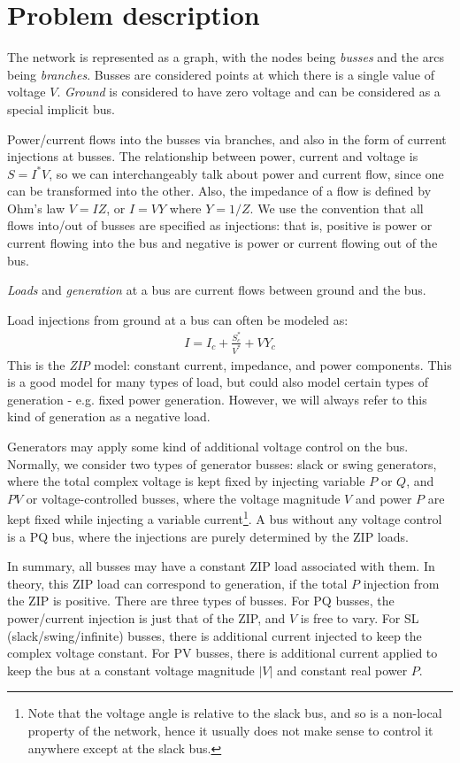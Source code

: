 \documentclass[11pt]{article}
\begin{document}
\section{Problem description}
The network is represented as a graph, with the nodes being \emph{busses} and the arcs being \emph{branches}. Busses are considered points at which there is a single value of voltage $V$. \emph{Ground} is considered to have zero voltage and can be considered as a special implicit bus. 

Power/current flows into the busses via branches, and also in the form of current injections at busses. The relationship between power, current and voltage is $S = I^*V$, so we can interchangeably talk about power and current flow, since one can be transformed into the other. Also, the impedance of a flow is defined by Ohm's law $V = IZ$, or $I = VY$ where $Y = 1/Z$. We use the convention that all flows into/out of busses are specified as injections: that is, positive is power or current flowing into the bus and negative is power or current flowing out of the bus.

\emph{Loads} and \emph{generation} at a bus are current flows between ground and the bus.

Load injections from ground at a bus can often be modeled as:
\begin{align}
	I = I_c + \frac{S^*_c}{V^*}  + VY_c
\end{align}
This is the \emph{ZIP} model: constant current, impedance, and power components. This is a good model for many types of load, but could also model certain types of generation - e.g. fixed power generation. However, we will always refer to this kind of generation as a negative load.

Generators may apply some kind of additional voltage control on the bus. Normally, we consider two types of generator busses: slack or swing generators, where the total complex voltage is kept fixed by injecting variable $P$ or $Q$, and $PV$ or voltage-controlled busses, where the voltage magnitude $V$ and power $P$ are kept fixed while injecting a variable current\footnote{Note that the voltage angle is relative to the slack bus, and so is a non-local property of the network, hence it usually does not make sense to control it anywhere except at the slack bus.}. A bus without any voltage control is a PQ bus, where the injections are purely determined by the ZIP loads.

In summary, all busses may have a constant ZIP load associated with them. In theory, this ZIP load can correspond to generation, if the total $P$ injection from the ZIP is positive. There are three types of busses. For PQ busses, the power/current injection is just that of the ZIP, and $V$ is free to vary. For SL (slack/swing/infinite) busses, there is additional current injected to keep the complex voltage constant. For PV busses, there is additional current applied to keep the bus at a constant voltage magnitude $|V|$ and constant real power $P$.
\end{document}
